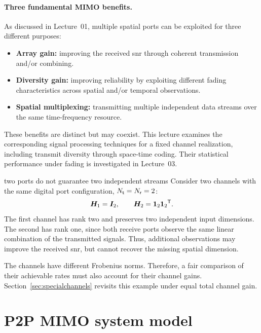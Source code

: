 \paragraph{Three fundamental MIMO benefits.}
As discussed in Lecture~01, multiple spatial ports can be exploited for three different purposes:
\begin{itemize}
	\item \textbf{Array gain:} improving the received \ac{snr} through coherent transmission and/or combining.
	\item \textbf{Diversity gain:} improving reliability by exploiting different fading characteristics across spatial and/or temporal observations.
	\item \textbf{Spatial multiplexing:} transmitting multiple independent data streams over the same time-frequency resource.
\end{itemize}
These benefits are distinct but may coexist. This lecture  examines the corresponding signal processing techniques for a fixed channel realization, including transmit diversity through space-time coding. Their statistical performance under fading is investigated in Lecture~03.

\begin{example}{two ports do not guarantee two independent streams}
	Consider two channels with the same digital port configuration, $N_{\mathsf{t}}=N_{\mathsf{r}}=2$:
	\begin{equation}
		\bm{H}_1=\bm{I}_2,\qquad
		\bm{H}_2=\bm{1}_2{\bm{1}_2}^{\mathsf{T}}.
	\end{equation}
	The first channel has rank two and preserves two independent input dimensions. The second has rank one, since both receive ports observe the same linear combination of the transmitted signals. Thus, additional observations may improve the received \ac{snr}, but cannot recover the missing spatial dimension.
	
	The channels have different Frobenius norms. Therefore, a fair comparison of their achievable rates must also account for their channel gains. Section~\ref{sec:specialchannels} revisits this example under equal total channel gain.
\end{example}

\section{P2P MIMO system model}\label{sec:model}

